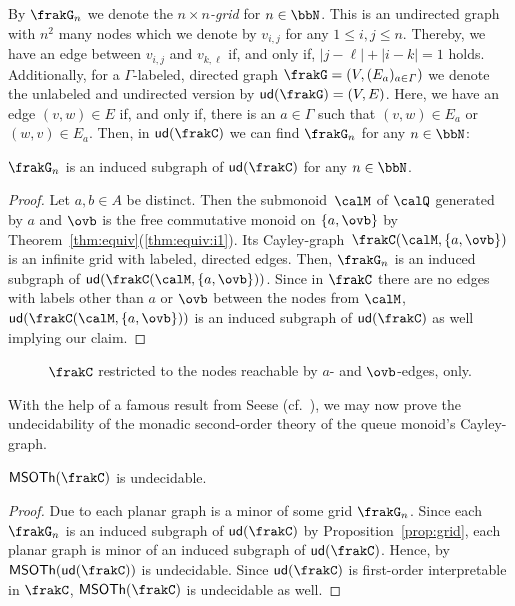 By $\frakG_n$ we denote the \emph{$n\times n$-grid} for $n\in\bbN$. This is an undirected graph with $n^2$ many nodes which we denote by $v_{i,j}$ for any $1\leq i,j\leq n$. Thereby, we have an edge between $v_{i,j}$ and $v_{k,\ell}$ if, and only if, $|j-\ell|+|i-k|=1$ holds.
Additionally, for a $\varGamma$-labeled, directed graph $\frakG=(V,(E_a)_{a\in\varGamma})$ we denote the unlabeled and undirected version by $\ud{\frakG}=(V,E)$. Here, we have an edge $(v,w)\in E$ if, and only if, there is an $a\in\varGamma$ such that $(v,w)\in E_a$ or $(w,v)\in E_a$. Then, in $\ud{\cQ}$ we can find $\frakG_n$ for any $n\in\bbN$:

\begin{proposition}\label{prop:grid}
	$\frakG_n$ is an induced subgraph of $\ud{\cQ}$ for any $n\in\bbN$.
\end{proposition}
\begin{proof}
	Let $a,b\in A$ be distinct. Then the submonoid~$\calM$ of $\Qx$ generated by $a$ and $\ovb$ is the free commutative monoid on $\{a,\ovb\}$ by Theorem~\ref{thm:equiv}(\ref{thm:equiv:i1}). Its Cayley-graph~$\cayley{\calM}{\{a,\ovb\}}$ is an infinite grid with labeled, directed edges. %
	Then, $\frakG_n$ is an induced subgraph of $\ud{\cayley{\calM}{\{a,\ovb\}}}$. Since in $\cQ$ there are no edges with labels other than $a$ or $\ovb$ between the nodes from $\calM$, $\ud{\cayley{\calM}{\{a,\ovb\}}}$ is an induced subgraph of $\ud{\cQ}$ as well implying our claim.
\end{proof}

\begin{figure}[h]
	\begin{center}
		
	\end{center}
	\caption{$\cQ$ restricted to the nodes reachable by $a$- and $\ovb$-edges, only.}\label{fig:grid}
\end{figure}

With the help of a famous result from Seese (cf.~\cite{See91}), we may now prove the undecidability of the monadic second-order theory of the queue monoid's Cayley-graph.

\begin{corollary}
	$\MSOTh{\cQ}$ is undecidable.
\end{corollary}
\begin{proof}
	Due to \cite{RobS84} each planar graph is a minor of some grid $\frakG_n$. Since each $\frakG_n$ is an induced subgraph of $\ud{\cQ}$ by Proposition~\ref{prop:grid}, each planar graph is minor of an induced subgraph of $\ud{\cQ}$. Hence, by \cite[Theorem~5]{See91} $\MSOTh{\ud{\cQ}}$ is undecidable. Since $\ud{\cQ}$ is first-order interpretable in $\cQ$, $\MSOTh{\cQ}$ is undecidable as well.
\end{proof}